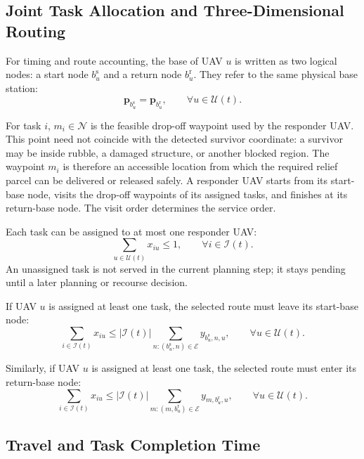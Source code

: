\documentclass[conference]{IEEEtran}
\begin{document}
\subsection{Joint Task Allocation and Three-Dimensional Routing}

For timing and route accounting, the base of UAV $u$ is written as two logical nodes: a start node $b_u^{\mathrm{s}}$ and a return node $b_u^{\mathrm{r}}$. They refer to the same physical base station:
\begin{equation}
\mathbf{p}_{b_u^{\mathrm{s}}}
=
\mathbf{p}_{b_u^{\mathrm{r}}},
\qquad
\forall u\in\mathcal{U}(t).
\end{equation}

For task $i$, $m_i\in\mathcal{N}$ is the feasible drop-off waypoint used by the responder UAV. This point need not coincide with the detected survivor coordinate: a survivor may be inside rubble, a damaged structure, or another blocked region. The waypoint $m_i$ is therefore an accessible location from which the required relief parcel can be delivered or released safely. A responder UAV starts from its start-base node, visits the drop-off waypoints of its assigned tasks, and finishes at its return-base node. The visit order determines the service order.

Each task can be assigned to at most one responder UAV:
\begin{equation}
\sum_{u\in\mathcal{U}(t)}
x_{iu}
\leq 1,
\qquad
\forall i\in\mathcal{I}(t).
\end{equation}
An unassigned task is not served in the current planning step; it stays pending until a later planning or recourse decision.

If UAV $u$ is assigned at least one task, the selected route must leave its start-base node:
\begin{equation}
\sum_{i\in\mathcal{I}(t)}
x_{iu}
\leq
|\mathcal{I}(t)|
\sum_{n:(b_u^{\mathrm{s}},n)\in\mathcal{E}}
y_{b_u^{\mathrm{s}},n,u},
\qquad
\forall u\in\mathcal{U}(t).
\end{equation}

Similarly, if UAV $u$ is assigned at least one task, the selected route must enter its return-base node:
\begin{equation}
\sum_{i\in\mathcal{I}(t)}
x_{iu}
\leq
|\mathcal{I}(t)|
\sum_{m:(m,b_u^{\mathrm{r}})\in\mathcal{E}}
y_{m,b_u^{\mathrm{r}},u},
\qquad
\forall u\in\mathcal{U}(t).
\end{equation}

\subsection{Travel and Task Completion Time}
\end{document}

